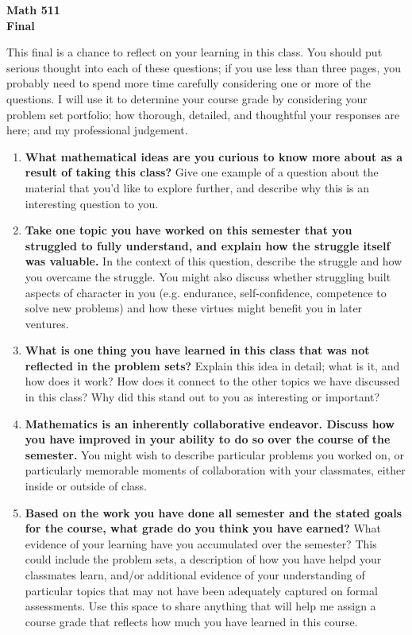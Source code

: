\documentclass{article}
\begin{document}
\begin{center}
\textbf{Math 511 \\ Final}
\end{center}

This final is a chance to reflect on your learning in this class. You should put serious thought into each of these questions; if you use less than three pages, you probably need to spend more time carefully considering one or more of the questions.  I will use it to determine your course grade by considering your problem set portfolio; how thorough, detailed, and thoughtful your responses are here; and my professional judgement.

\begin{enumerate}
\item \textbf{What mathematical ideas are you curious to know more about as a result of taking this class?}  Give one example of a question about the material that you'd like to explore further, and describe why this is an interesting question to you.


\item \textbf{Take one topic you have worked on this semester that you struggled to fully understand, and explain how the struggle itself was valuable.}  In the context of this question, describe the struggle and how you overcame the struggle. You might also discuss whether struggling built aspects of character in you (e.g. endurance, self-confidence, competence to solve new problems) and how these virtues might benefit you in later ventures.

\item \textbf{What is one thing you have learned in this class that was not reflected in the problem sets?}  Explain this idea in detail; what is it, and how does it work? How does it connect to the other topics we have discussed in this class?  Why did this stand out to you as interesting or important?

\item \textbf{Mathematics is an inherently collaborative endeavor. Discuss how you have improved in your ability to do so over the course of the semester.} You might wish to describe particular problems you worked on, or particularly memorable moments of collaboration with your classmates, either inside or outside of class. 

\item \textbf{Based on the work you have done all semester and the stated goals for the course, what grade do you think you have earned?} What evidence of your learning have you accumulated over the semester? This could include the problem sets, a description of how you have helpd your classmates learn, and/or additional evidence of your understanding of particular topics that may not have been adequately captured on formal assessments. Use this space to share anything that will help me assign a course grade that reflects how much you have learned in this course.
\end{enumerate}
\end{document}
